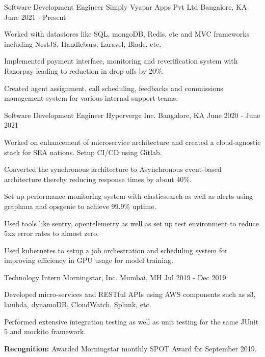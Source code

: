 \begin{cventries}
  \cventry
  {Software Development Engineer}
  {Simply Vyapar Apps Pvt Ltd}
  {Bangalore, KA}
  {June 2021 - Present}
  {
    \begin{cvitems}
      \item {Worked with datastores like SQL, mongoDB, Redis, etc and MVC frameworks including NestJS, Handlebars, Laravel, Blade, etc.}
      \item {Implemented payment interface, monitoring and reverification system with Razorpay leading to reduction in drop-offs by 20\%.}
      \item {Created agent assignment, call scheduling, feedbacks and commissions management system for various internal support teams.}
    \end{cvitems}
  }
  \cventry
  {Software Development Engineer}
  {Hyperverge Inc.}
  {Bangalore, KA}
  {June 2020 - June 2021}
  {
    \begin{cvitems}
      \item {Worked on enhancement of microservice architecture and created a cloud-agnostic stack for SEA nations. Setup CI/CD using Gitlab.}
      \item {Converted the synchronous architecture to Asynchronous event-based architecture thereby reducing response times by about 40\%.}    
      \item {Set up performance monitoring system with elasticsearch as well as alerts using graphana and opsgenie to achieve 99.9\% uptime.}
      \item {Used tools like sentry, opentelemetry as well as set up test environment to reduce 5xx error rates to almost zero.}
      \item {Used kubernetes to setup a job orchestration and scheduling system for improving efficiency in GPU usage for model training.}
    \end{cvitems}
  }
  \cventry
    {Technology Intern}
    {Morningstar, Inc.}
    {Mumbai, MH}
    {Jul 2019 - Dec 2019}
    {
      \begin{cvitems}
        \item {Developed micro-services and RESTful APIs using AWS components such as s3, lambda, dynamoDB, CloudWatch, Splunk, etc.}
        \item {Performed extensive integration testing as well as unit testing for the same JUnit 5 and mockito framework.}
        \item {\textbf{Recognition:} Awarded Morningstar monthly SPOT Award for September 2019.}

\end{cvitems}}
\end{cventries}
